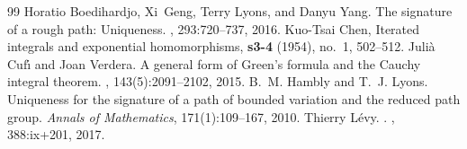 \documentclass[10pt,a4paper]{amsart}
\begin{document}
\begin{thebibliography}{99}
 Horatio Boedihardjo, Xi~Geng, Terry Lyons, and Danyu Yang. \newblock The signature of a rough path: Uniqueness. , 293:720--737, 2016.
 Kuo-Tsai Chen, \newblock Iterated integrals and exponential homomorphisms,  \textbf{s3-4} (1954), no.~1, 502--512.
 Juli{\`a} Cuf{\'\i} and Joan Verdera. \newblock A general form of {G}reen's formula and the {C}auchy integral theorem. , 143(5):2091--2102, 2015.
 B.~M. Hambly and T.~J. Lyons. \newblock Uniqueness for the signature of a path of bounded variation and the reduced path group. \newblock \emph{Annals of Mathematics}, 171(1):109--167, 2010.
 Thierry L{\'e}vy. . , 388:ix+201, 2017.
\end{thebibliography}
\end{document}
